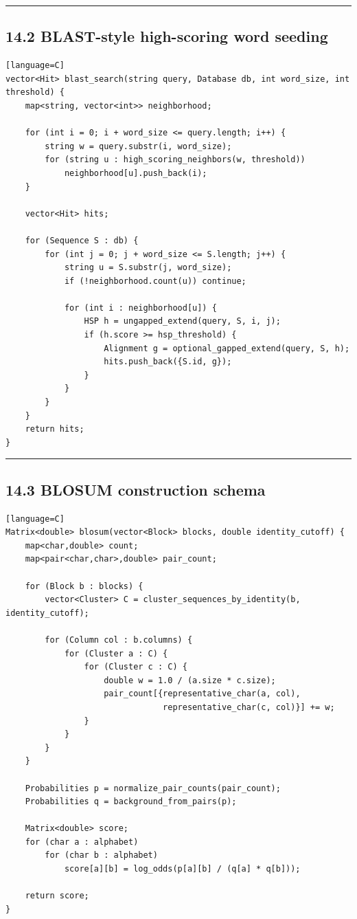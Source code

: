 \documentclass[11pt]{article}
\begin{document}
\begin{center}\rule{0.5\linewidth}{0.5pt}\end{center}

\subsection{14.2 BLAST-style high-scoring word seeding}\label{blast-style-high-scoring-word-seeding}

\begin{verbatim}[language=C]
vector<Hit> blast_search(string query, Database db, int word_size, int threshold) {
    map<string, vector<int>> neighborhood;

    for (int i = 0; i + word_size <= query.length; i++) {
        string w = query.substr(i, word_size);
        for (string u : high_scoring_neighbors(w, threshold))
            neighborhood[u].push_back(i);
    }

    vector<Hit> hits;

    for (Sequence S : db) {
        for (int j = 0; j + word_size <= S.length; j++) {
            string u = S.substr(j, word_size);
            if (!neighborhood.count(u)) continue;

            for (int i : neighborhood[u]) {
                HSP h = ungapped_extend(query, S, i, j);
                if (h.score >= hsp_threshold) {
                    Alignment g = optional_gapped_extend(query, S, h);
                    hits.push_back({S.id, g});
                }
            }
        }
    }
    return hits;
}
\end{verbatim}

\begin{center}\rule{0.5\linewidth}{0.5pt}\end{center}

\subsection{14.3 BLOSUM construction schema}\label{blosum-construction-schema}

\begin{verbatim}[language=C]
Matrix<double> blosum(vector<Block> blocks, double identity_cutoff) {
    map<char,double> count;
    map<pair<char,char>,double> pair_count;

    for (Block b : blocks) {
        vector<Cluster> C = cluster_sequences_by_identity(b, identity_cutoff);

        for (Column col : b.columns) {
            for (Cluster a : C) {
                for (Cluster c : C) {
                    double w = 1.0 / (a.size * c.size);
                    pair_count[{representative_char(a, col),
                                representative_char(c, col)}] += w;
                }
            }
        }
    }

    Probabilities p = normalize_pair_counts(pair_count);
    Probabilities q = background_from_pairs(p);

    Matrix<double> score;
    for (char a : alphabet)
        for (char b : alphabet)
            score[a][b] = log_odds(p[a][b] / (q[a] * q[b]));

    return score;
}
\end{verbatim}
\end{document}
